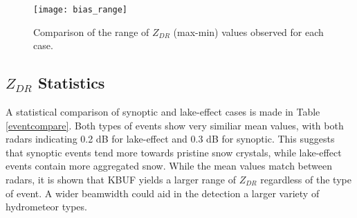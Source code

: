 \begin{figure}[H]
\centering
\texttt{[image: bias\_range]}
\caption{Comparison of the range of $Z_{DR}$ (max-min) values observed for each case.} 
\label{fig:bias_range}
\end{figure}
\subsection{$Z_{DR}$ Statistics}
A statistical comparison of synoptic and lake-effect cases is made in Table \ref{eventcompare}. Both types of events show very similiar mean values, with both radars indicating 0.2 dB for lake-effect and 0.3 dB for synoptic. This suggests that synoptic events tend more towards pristine snow crystals, while lake-effect events contain more aggregated snow. While the mean values match between radars, it is shown that KBUF yields a larger range of $Z_{DR}$ regardless of the type of event. A wider beamwidth could aid in the detection a larger variety of hydrometeor types.
